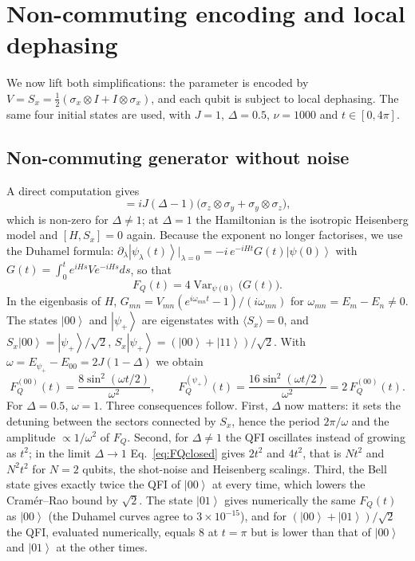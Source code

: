 \documentclass[10.5pt,a4paper]{article}
\newcommand{\ket}[1]{\left|#1\right\rangle}
\newcommand{\Var}{\operatorname{Var}}
\newcommand{\FQ}{F_Q}
\begin{document}
\section{Non-commuting encoding and local dephasing}\label{sec:noncomm}

We now lift both simplifications: the parameter is encoded by $V=S_x=\tfrac12(\sigma_x\otimes I+I\otimes\sigma_x)$, and each qubit is subject to local dephasing. The same four initial states are used, with $J=1$, $\Delta=0.5$, $\nu=1000$ and $t\in[0,4\pi]$.

\subsection{Non-commuting generator without noise}
A direct computation gives
\begin{equation}
  [H_{XXZ},S_x]=iJ(\Delta-1)\bigl(\sigma_z\otimes\sigma_y+\sigma_y\otimes\sigma_z\bigr),
\end{equation}
which is non-zero for $\Delta\neq1$; at $\Delta=1$ the Hamiltonian is the isotropic Heisenberg model and $[H,S_x]=0$ again. Because the exponent no longer factorises, we use the Duhamel formula: $\partial_\lambda\ket{\psi_\lambda(t)}\big|_{\lambda=0}=-i\,e^{-iHt}G(t)\ket{\psi(0)}$ with $G(t)=\int_0^te^{iHs}Ve^{-iHs}ds$, so that
\begin{equation}
  \FQ(t)=4\Var_{\psi(0)}\bigl(G(t)\bigr).
\end{equation}
In the eigenbasis of $H$, $G_{mn}=V_{mn}(e^{i\omega_{mn}t}-1)/(i\omega_{mn})$ for $\omega_{mn}=E_m-E_n\neq0$. The states $\ket{00}$ and $\ket{\psi_+}$ are eigenstates with $\langle S_x\rangle=0$, and $S_x\ket{00}=\ket{\psi_+}/\sqrt2$, $S_x\ket{\psi_+}=(\ket{00}+\ket{11})/\sqrt2$. With $\omega=E_{\psi_+}-E_{00}=2J(1-\Delta)$ we obtain
\begin{equation}
  \FQ^{(00)}(t)=\frac{8\sin^2(\omega t/2)}{\omega^2},\qquad
  \FQ^{(\psi_+)}(t)=\frac{16\sin^2(\omega t/2)}{\omega^2}=2\,\FQ^{(00)}(t).
  \label{eq:FQclosed}
\end{equation}
For $\Delta=0.5$, $\omega=1$. Three consequences follow. First, $\Delta$ now matters: it sets the detuning between the sectors connected by $S_x$, hence the period $2\pi/\omega$ and the amplitude $\propto1/\omega^2$ of $\FQ$. Second, for $\Delta\neq1$ the QFI oscillates instead of growing as $t^2$; in the limit $\Delta\to1$ Eq.~\eqref{eq:FQclosed} gives $2t^2$ and $4t^2$, that is $Nt^2$ and $N^2t^2$ for $N=2$ qubits, the shot-noise and Heisenberg scalings. Third, the Bell state gives exactly twice the QFI of $\ket{00}$ at every time, which lowers the Cram\'er--Rao bound by $\sqrt2$. The state $\ket{01}$ gives numerically the same $\FQ(t)$ as $\ket{00}$ (the Duhamel curves agree to $3\times10^{-15}$), and for $(\ket{00}+\ket{01})/\sqrt2$ the QFI, evaluated numerically, equals $8$ at $t=\pi$ but is lower than that of $\ket{00}$ and $\ket{01}$ at the other times.
\end{document}
